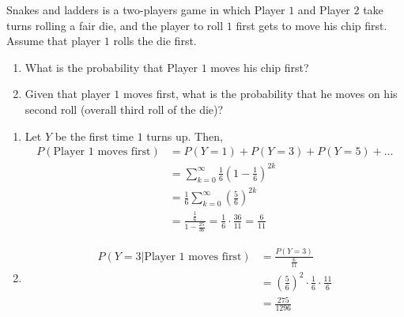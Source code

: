 \begin{example}
    Snakes and ladders is a two-players game in which Player $1$ and Player $2$
take turns rolling a fair die, and the player to roll $1$ first gets to move
his chip first. Assume that player $1$ rolls the die first.
\begin{enumerate}[noitemsep, topsep=0em]
    \item What is the probability that Player $1$ moves his chip first?
    \item Given that player $1$ moves first, what is the probability that he
moves on his second roll (overall third roll of the die)?
\end{enumerate}
\end{example}
\begin{solution}
    \begin{enumerate}[noitemsep, topsep=0em]
        \item 
        Let $Y$ be the first time $1$ turns up. Then,
        \begin{align*}
            P(\text{Player $1$ moves first})
                &= P(Y = 1) + P(Y = 3) + P(Y = 5) + \dots                    \\
                &= \sum_{k = 0}^\infty \frac{1}{6}(1 - \frac{1}{6})^{2k}     \\
                &= \frac{1}{6} \sum_{k = 0}^\infty (\frac{5}{6})^{2k}        \\
                &= \frac{\frac{1}{6}}{1 - \frac{25}{36}}
                 = \frac{1}{6} \cdot \frac{36}{11}
                 = \frac{6}{11}
        \end{align*}
        \item
        \begin{align*}
            P(Y = 3 \vert \text{Player $1$ moves first})
                &= \frac{P(Y = 3)}{\frac{6}{11}}                             \\
                &= (\frac{5}{6})^2 \cdot \frac{1}{6} \cdot \frac{11}{6}      \\
                &= \frac{275}{1296}
        \end{align*}
    \end{enumerate}
\end{solution}